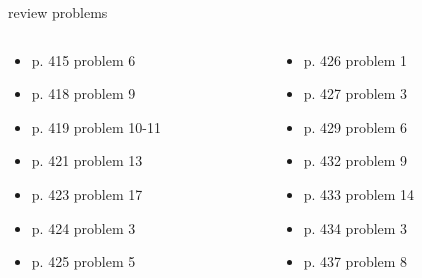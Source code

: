 \documentclass[10pt]{beamer}
\begin{document}
\begin{frame}{review problems}
	\begin{columns}
		\begin{column}{0.4\textwidth}
			\begin{itemize}
				\item p. 415 problem 6
				\item p. 418 problem 9
				\item p. 419 problem 10-11
				\item p. 421 problem 13
				\item p. 423 problem 17
				\item p. 424 problem 3
				\item p. 425 problem 5
			\end{itemize}
		\end{column}
		\begin{column}{0.4\textwidth}
			\begin{itemize}
				\item p. 426 problem 1
				\item p. 427 problem 3
				\item p. 429 problem 6
				\item p. 432 problem 9
				\item p. 433 problem 14
				\item p. 434 problem 3
				\item p. 437 problem 8
			\end{itemize}
		\end{column}
	\end{columns}
\end{frame}
\end{document}
